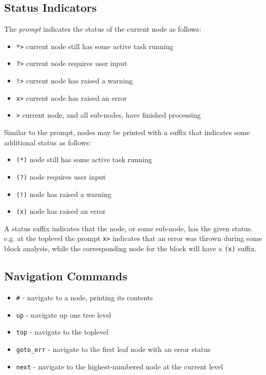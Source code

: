 \subsection{Status Indicators}

The \emph{prompt} indicates the status of the current node as follows:
\begin{itemize}
\item \texttt{*>} current node still has some active task running
\item \texttt{?>} current node requires user input
\item \texttt{!>} current node has raised a warning
\item \texttt{x>} current node has raised an error
\item \texttt{>} current node, and all sub-nodes, have finished processing
\end{itemize}

Similar to the prompt, nodes may be printed with a suffix that indicates some additional status as follows:
\begin{itemize}
\item \texttt{(*)} node still has some active task running
\item \texttt{(?)} node requires user input
\item \texttt{(!)} node has raised a warning
\item \texttt{(x)} node has raised an error
\end{itemize}
A status suffix indicates that the node, or some sub-node, has the given status.
e.g. at the toplevel the prompt \texttt{x>} indicates that an error was thrown during some block analysis, while the corresponding node for the block will have a \texttt{(x)} suffix.

\subsection{Navigation Commands}

\begin{itemize}
\item \texttt{\#} - navigate to a node, printing its contents
\item \texttt{up} - navigate up one tree level
\item \texttt{top} - navigate to the toplevel
\item \texttt{goto\_err} - navigate to the first leaf node with an error status
\item \texttt{next} - navigate to the highest-numbered node at the current level
\end{itemize}

